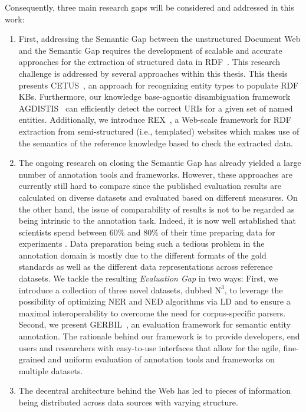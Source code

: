 Consequently, three main research gaps will be considered and addressed in this work:
\begin{enumerate}
\item 
First, addressing the Semantic Gap between the unstructured Document Web and the Semantic Gap requires the development of scalable and accurate approaches for the extraction of structured data in \ac{RDF}~\cite{rdfprimer}.
This research challenge is addressed by several approaches within this thesis.
This thesis presents CETUS~\cite{CETUS_2015}, an approach for recognizing entity types to populate \ac{RDF} \ac{KB}s. 
Furthermore, our knowledge base-agnostic disambiguation framework AGDISTIS~\cite{agdistis_iswc} can efficiently detect the correct URIs for a given set of named entities.
Additionally, we introduce REX~\cite{rex}, a Web-scale framework for \ac{RDF} extraction from semi-structured (i.e., templated) websites which makes use of the semantics of the reference knowledge based to check the extracted data.
\item 
The ongoing research on closing the Semantic Gap has already yielded a large number of annotation tools and frameworks.
However, these approaches are currently still hard to compare since the published evaluation results are calculated on diverse datasets and evaluated based on different measures.
On the other hand, the issue of  comparability of results is not to be regarded as being intrinsic to the annotation task. 
Indeed, it is now well established that scientists spend between 60\% and 80\% of their time preparing data for experiments \cite{GIL2014,jermyn1999preparing,peng2011reproducible}. 
Data preparation being such a tedious problem in the annotation domain is mostly due to the different formats of the gold standards as well as the different data representations across reference datasets.
We tackle the resulting \emph{Evaluation Gap} in two ways: First, we introduce a collection of three novel datasets, dubbed $\mbox{N}^3$, to leverage the possibility of optimizing NER and NED algorithms via \ac{LD} and to ensure a maximal interoperability to overcome the need for corpus-specific parsers. 
Second, we present GERBIL~\cite{GERBIL}, an evaluation framework for semantic entity annotation. 
The rationale behind our framework is to provide developers, end users and researchers with easy-to-use interfaces that allow for the agile, fine-grained and uniform evaluation of annotation tools and frameworks on multiple datasets.
\item 
The decentral architecture behind the Web has led to pieces of information being distributed across data sources with varying structure. 

\end{enumerate}
